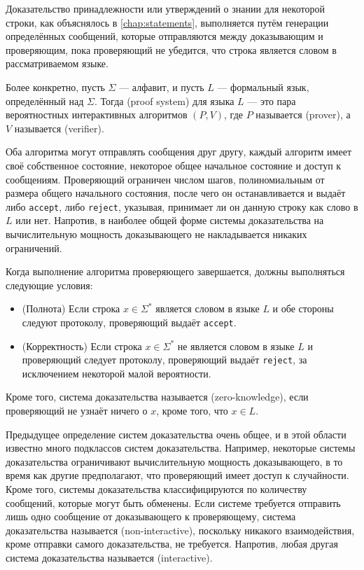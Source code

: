 Доказательство принадлежности или утверждений о знании для некоторой строки, как объяснялось в \chaptname{} \ref{chap:statements}, выполняется путём генерации определённых сообщений, которые отправляются между доказывающим и проверяющим, пока проверяющий не убедится, что строка является словом в рассматриваемом языке.

Более конкретно, пусть $\Sigma$ --- алфавит, и пусть $L$ --- формальный язык, определённый над $\Sigma$. Тогда  (proof system) для языка $L$ --- это пара вероятностных интерактивных алгоритмов $(P,V)$, где $P$ называется  (prover), а $V$ называется  (verifier).

Оба алгоритма могут отправлять сообщения друг другу, каждый алгоритм имеет своё собственное состояние, некоторое общее начальное состояние и доступ к сообщениям. Проверяющий ограничен числом шагов, полиномиальным от размера общего начального состояния, после чего он останавливается и выдаёт либо \texttt{accept}, либо \texttt{reject}, указывая, принимает ли он данную строку как слово в $L$ или нет. Напротив, в наиболее общей форме системы доказательства на вычислительную мощность доказывающего не накладывается никаких ограничений.

Когда выполнение алгоритма проверяющего завершается, должны выполняться следующие условия:
\begin{itemize}
\item (Полнота) Если строка $x\in \Sigma^*$ является словом в языке $L$ и обе стороны следуют протоколу, проверяющий выдаёт \texttt{accept}.
\item (Корректность) Если строка $x\in \Sigma^*$ не является словом в языке $L$ и проверяющий следует протоколу, проверяющий выдаёт \texttt{reject}, за исключением некоторой малой вероятности.
\end{itemize}
Кроме того, система доказательства называется  (zero-knowledge), если проверяющий не узнаёт ничего о $x$, кроме того, что $x\in L$.

Предыдущее определение систем доказательства очень общее, и в этой области известно много подклассов систем доказательства. Например, некоторые системы доказательства ограничивают вычислительную мощность доказывающего, в то время как другие предполагают, что проверяющий имеет доступ к случайности. Кроме того, системы доказательства классифицируются по количеству сообщений, которые могут быть обменены. Если системе требуется отправить лишь одно сообщение от доказывающего к проверяющему, система доказательства называется  (non-interactive), поскольку никакого взаимодействия, кроме отправки самого доказательства, не требуется. Напротив, любая другая система доказательства называется  (interactive).


